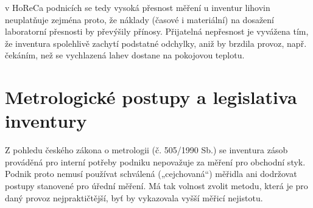 %
%
%
%	
v HoReCa podnicích se tedy vysoká přesnost měření u inventur lihovin neuplatňuje zejména proto, že náklady (časové i materiální) na dosažení laboratorní přesnosti by převýšily přínosy. Přijatelná nepřesnost je vyvážena tím, že inventura spolehlivě zachytí podstatné odchylky, aniž by brzdila provoz, např. čekáním, než se vychlazená lahev dostane na pokojovou teplotu.

%

\section{Metrologické postupy a legislativa inventury}
Z pohledu českého zákona o metrologii (č. 505/1990 Sb.) se inventura zásob prováděná pro interní potřeby podniku nepovažuje za měření pro obchodní styk. Podnik proto nemusí používat schválená („cejchovaná“) měřidla ani dodržovat postupy stanovené pro úřední měření. Má tak volnost zvolit metodu, která je pro daný provoz nejpraktičtější, byť by vykazovala vyšší měřicí nejistotu.

